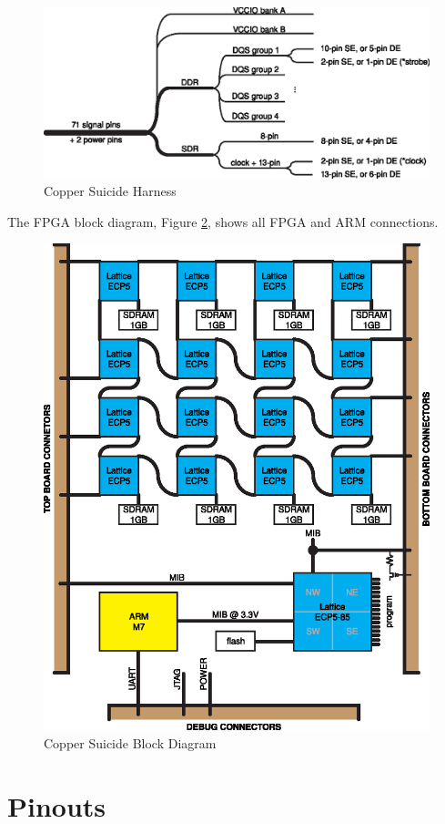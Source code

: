 \documentclass{article}
\begin{document}
\begin{figure}[H]
  \centering
  \includegraphics[scale=1]{cs_harness.eps}
	\caption{Copper Suicide Harness}
	\label{fig:harness}
\end{figure}

The FPGA block diagram, Figure \ref{fig:blockdiagram}, shows all FPGA and ARM connections.

\begin{figure}[H]
  \centering
  \includegraphics[scale=1]{cs_block_diagram.eps}
	\caption{Copper Suicide Block Diagram}
	\label{fig:blockdiagram}
\end{figure}

\newpage

\section{Pinouts}
\end{document}
